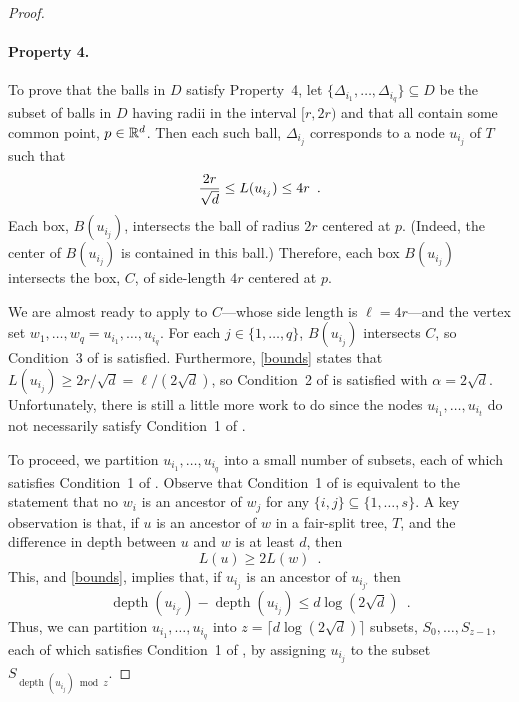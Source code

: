 \documentclass{patmorin}
\DeclareMathOperator{\depth}{depth}
\begin{document}
\begin{proof}
  \paragraph{Property 4.}
  To prove that the balls in $D$ satisfy Property~4, let
  $\{\Delta_{i_1},\ldots,\Delta_{i_q}\}\subseteq D$ be the subset of
  balls in $D$ having radii in the interval $[r,2r)$ and that all contain
  some common point, $p\in\mathbb{R}^d$.   Then each such ball, $\Delta_{i_j}$
  corresponds to a node $u_{i_j}$ of $T$ such that
  \begin{equation}
        \frac{2r}{\sqrt{d}} \le L(u_{i_j}) \le 4r \enspace . \eqlabel{bounds}
  \end{equation}
  Each box, $B(u_{i_j})$, intersects the ball of radius $2r$ centered at
  $p$.  (Indeed, the center of $B(u_{i_j})$ is contained in this ball.)
  Therefore, each box $B(u_{i_j})$ intersects the box, $C$, of side-length
  $4r$ centered at $p$.

  We are almost ready to apply  to
  $C$---whose side length is $\ell = 4r$---and the vertex set
  $w_1,\ldots,w_q=u_{i_1},\ldots,u_{i_q}$. For each $j\in\{1,\ldots,q\}$,
  $B(u_{i_j})$ intersects $C$, so Condition~3 of 
  is satisfied.  Furthermore, \eqref{bounds} states that $L(u_{i_j})\ge
  2r/\sqrt{d} = \ell/(2\sqrt{d})$, so Condition~2 of 
  is satisfied with $\alpha=2\sqrt{d}$.  Unfortunately, there is still
  a little more work to do since the nodes $u_{i_1},\ldots,u_{i_t}$
  do not necessarily satisfy Condition~1 of .

  To proceed, we partition $u_{i_1},\ldots,u_{i_q}$ into a small number of
  subsets, each of which satisfies Condition~1 of .
  Observe that Condition~1 of  is equivalent
  to the statement that no $w_i$ is an ancestor of $w_j$ for any
  $\{i,j\}\subseteq\{1,\ldots,s\}$.  A key observation is that, if $u$
  is an ancestor of $w$ in a fair-split tree, $T$, and the difference
  in depth between $u$ and $w$ is at least $d$, then
  \[
      L(u) \ge 2L(w) \enspace .
  \]
  This, and \eqref{bounds}, implies that, if $u_{i_j}$ is an ancestor
  of $u_{i_{j'}}$ then
  \[
     \depth(u_{i_{j'}})-\depth(u_{i_{j}}) \le d\log(2\sqrt{d}) \enspace .
  \]
  Thus, we can partition $u_{i_1},\ldots,u_{i_q}$ into $z=\lceil
  d\log(2\sqrt{d})\rceil$ subsets, $S_0,\ldots,S_{z-1}$, each of which
  satisfies Condition~1 of , by assigning $u_{i_j}$
  to the subset $S_{\depth(u_{i_j})\bmod z}$.  


\end{proof}
\end{document}

